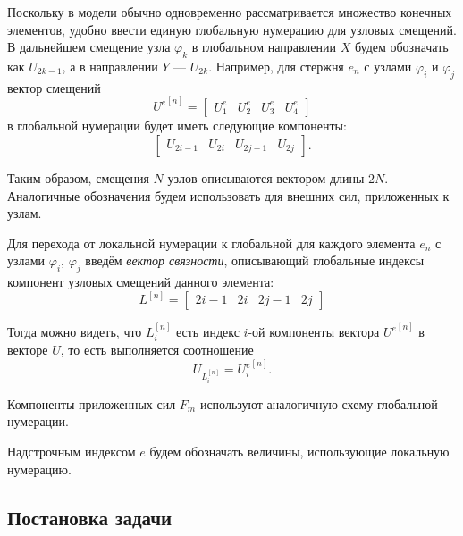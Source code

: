 \documentclass[10pt]{article}
\numberwithin{equation}{section}
\renewcommand{\phi}{\varphi}
\newcommand{\neword}{\emph}
\newcommand{\node}[1]{$\phi_{#1}$}
\newcommand{\element}[1]{$e_{#1}$}
\begin{document}
Поскольку в модели обычно одновременно рассматривается множество
конечных элементов, удобно ввести единую глобальную нумерацию для
узловых смещений. В дальнейшем смещение узла \node{k} в глобальном
направлении $X$ будем обозначать как $U_{2k-1}$, а в направлении $Y$ —
$U_{2k}$. Например, для стержня \element{n} с узлами \node{i} и \node{j} вектор
смещений
\begin{equation*}
  {U^e}^{[n]}=
  \begin{bmatrix}
    U_1^e & U_2^e & U_3^e & U_4^e
  \end{bmatrix}
\end{equation*}
в глобальной нумерации будет иметь следующие компоненты:
\begin{equation}
  \label{eq:global-numbering}
  \begin{bmatrix}
    U_{2i-1} & U_{2i} & U_{2j-1} & U_{2j}
  \end{bmatrix}.
\end{equation}
 
Таким образом, смещения $N$ узлов описываются вектором длины $2N$.
Аналогичные обозначения будем использовать для внешних сил,
приложенных к узлам.

Для перехода от локальной нумерации к глобальной для каждого элемента
\element{n} с узлами \node{i}, \node{j} введём \neword{вектор
  связности}, описывающий глобальные индексы компонент узловых
смещений данного элемента:
\begin{equation}
  \label{eq:glob-num-vector}
  L^{[n]} =
  \begin{bmatrix}
    2i-1 & 2i & 2j-1 & 2j
  \end{bmatrix}
\end{equation}

Тогда можно видеть, что $L_i^{[n]}$ есть индекс $i$-ой компоненты
вектора ${U^e}^{[n]}$ в векторе $U$, то есть выполняется соотношение
\begin{equation}
  \label{eq:num-vector-transform}
  U_{L_i^{[n]}} = {U_i^e}^{[n]}.
\end{equation}

Компоненты приложенных сил $F_m$ используют аналогичную схему
глобальной нумерации.

Надстрочным индексом $e$ будем обозначать величины, использующие локальную
нумерацию.

\subsection{Постановка задачи}
\label{sec:static-truss}
\end{document}

